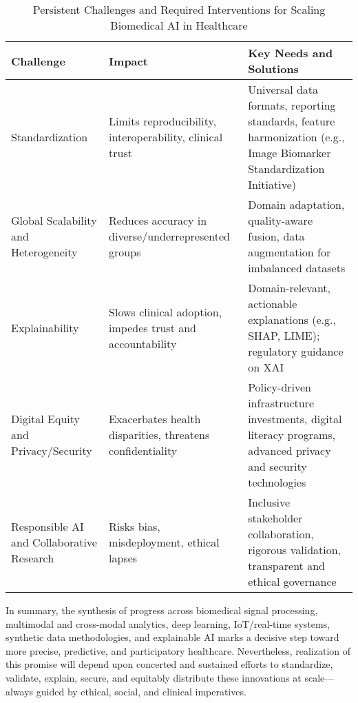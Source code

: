 \begin{table*}[htbp]
\centering
\caption{Persistent Challenges and Required Interventions for Scaling Biomedical AI in Healthcare}
\label{tab:challenges_summary}
\begin{adjustbox}{max width=\textwidth}
\begin{tabular}{lll}
\toprule
\textbf{Challenge} & \textbf{Impact} & \textbf{Key Needs and Solutions} \\
\midrule
Standardization & Limits reproducibility, interoperability, clinical trust & Universal data formats, reporting standards, feature harmonization (e.g., Image Biomarker Standardization Initiative) \\
Global Scalability and Heterogeneity & Reduces accuracy in diverse/underrepresented groups & Domain adaptation, quality-aware fusion, data augmentation for imbalanced datasets \\
Explainability & Slows clinical adoption, impedes trust and accountability & Domain-relevant, actionable explanations (e.g., SHAP, LIME); regulatory guidance on XAI\\
Digital Equity and Privacy/Security & Exacerbates health disparities, threatens confidentiality & Policy-driven infrastructure investments, digital literacy programs, advanced privacy and security technologies \\
Responsible AI and Collaborative Research & Risks bias, misdeployment, ethical lapses & Inclusive stakeholder collaboration, rigorous validation, transparent and ethical governance \\
\bottomrule
\end{tabular}
\end{adjustbox}
\end{table*}

In summary, the synthesis of progress across biomedical signal processing, multimodal and cross-modal analytics, deep learning, IoT/real-time systems, synthetic data methodologies, and explainable AI marks a decisive step toward more precise, predictive, and participatory healthcare. Nevertheless, realization of this promise will depend upon concerted and sustained efforts to standardize, validate, explain, secure, and equitably distribute these innovations at scale—always guided by ethical, social, and clinical imperatives.

